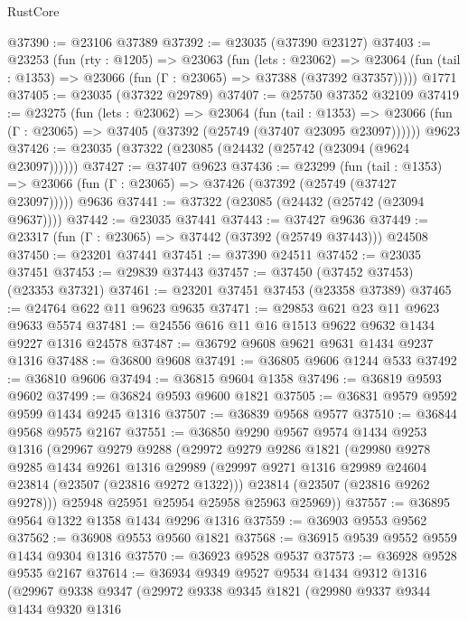 \begin{lexlean}{RustCore}
\begin{coremodule}
@37390 := @23106 @37389
@37392 := @23035 (@37390 @23127)
@37403 := @23253
    (fun (rty : @1205) =>
    @23063
      (fun (lets : @23062) =>
      @23064 (fun (tail : @1353) => @23066 (fun (Γ : @23065) => @37388 (@37392 @37357)))))
    @1771
@37405 := @23035 (@37322 @29789)
@37407 := @25750 @37352 @32109
@37419 := @23275
    (fun (lets : @23062) =>
    @23064
      (fun (tail : @1353) =>
      @23066 (fun (Γ : @23065) => @37405 (@37392 (@25749 (@37407 @23095 @23097))))))
    @9623
@37426 := @23035 (@37322 (@23085 (@24432 (@25742 (@23094 (@9624 @23097))))))
@37427 := @37407 @9623
@37436 := @23299
    (fun (tail : @1353) => @23066 (fun (Γ : @23065) => @37426 (@37392 (@25749 (@37427 @23097)))))
    @9636
@37441 := @37322 (@23085 (@24432 (@25742 (@23094 @9637))))
@37442 := @23035 @37441
@37443 := @37427 @9636
@37449 := @23317 (fun (Γ : @23065) => @37442 (@37392 (@25749 @37443))) @24508
@37450 := @23201 @37441
@37451 := @37390 @24511
@37452 := @23035 @37451
@37453 := @29839 @37443
@37457 := @37450 (@37452 @37453) (@23353 @37321)
@37461 := @23201 @37451 @37453 (@23358 @37389)
@37465 := @24764 @622 @11 @9623 @9635
@37471 := @29853 @621 @23 @11 @9623 @9633 @5574
@37481 := @24556 @616 @11 @16 @1513 @9622 @9632 @1434 @9227 @1316 @24578
@37487 := @36792 @9608 @9621 @9631 @1434 @9237 @1316
@37488 := @36800 @9608
@37491 := @36805 @9606 @1244 @533
@37492 := @36810 @9606
@37494 := @36815 @9604 @1358
@37496 := @36819 @9593 @9602
@37499 := @36824 @9593 @9600 @1821
@37505 := @36831 @9579 @9592 @9599 @1434 @9245 @1316
@37507 := @36839 @9568 @9577
@37510 := @36844 @9568 @9575 @2167
@37551 := @36850
    @9290
    @9567
    @9574
    @1434
    @9253
    @1316
    (@29967
      @9279
      @9288
      (@29972
        @9279
        @9286
        @1821
        (@29980
          @9278
          @9285
          @1434
          @9261
          @1316
          @29989
          (@29997 @9271 @1316 @29989 @24604 @23814 (@23507 (@23816 @9272 @1322)))
          @23814
          (@23507 (@23816 @9262 @9278)))
        @25948
        @25951
        @25954
        @25958
        @25963
        @25969))
@37557 := @36895 @9564 @1322 @1358 @1434 @9296 @1316
@37559 := @36903 @9553 @9562
@37562 := @36908 @9553 @9560 @1821
@37568 := @36915 @9539 @9552 @9559 @1434 @9304 @1316
@37570 := @36923 @9528 @9537
@37573 := @36928 @9528 @9535 @2167
@37614 := @36934
    @9349
    @9527
    @9534
    @1434
    @9312
    @1316
    (@29967
      @9338
      @9347
      (@29972
        @9338
        @9345
        @1821
        (@29980
          @9337
          @9344
          @1434
          @9320
          @1316

\end{coremodule}
\end{lexlean}
